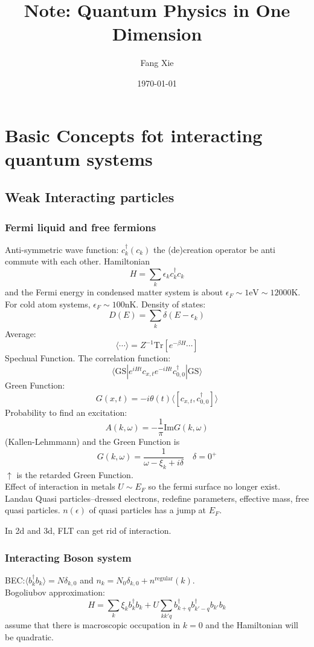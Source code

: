\documentclass{article}
\title{\bf Note: Quantum Physics in One Dimension}
\author{Fang Xie}
\date{\today}
\begin{document}
\maketitle
\section{Basic Concepts fot interacting quantum systems}
\subsection{Weak Interacting particles}
\subsubsection{Fermi liquid and free fermions}
Anti-symmetric wave function: $c^\dagger_k(c_k)$ the (de)creation operator be anti commute with each other. Hamiltonian
$$
H = \sum_k \epsilon_k c^\dagger_kc_k
$$
and the Fermi energy in condensed matter system is about $\epsilon_F \sim 1\mathrm{eV}\sim 12000\mathrm{K}$. For cold atom systems, $\epsilon_F \sim 100\mathrm{nK}$. 
Density of states:
$$
D(E) = \sum_k \delta(E-\epsilon_k)
$$
Average:
$$
\langle \cdots \rangle = Z^{-1}\mathrm{Tr}\left[e^{-\beta H}\cdots\right]
$$
Spechual Function. The correlation function:
$$
\langle \mathrm{GS} | e^{iHt}c_{x,t}e^{-iHt}c^\dagger_{0,0}|\mathrm{GS}\rangle
$$
Green Function:
$$
G(x,t)=-i\theta(t)\langle [c_{x,t},c^\dagger_{0,0}]\rangle
$$
Probability to find an excitation:
$$
A(k,\omega) = -\frac{1}{\pi}\mathrm{Im}{G(k,\omega)}
$$
(Kallen-Lehmmann)
and the Green Function is
$$
G(k,\omega) = \frac{1}{\omega-\xi_k+i\delta}\quad \delta = 0^+
$$
$\uparrow$ is the retarded Green Function.\\
Effect of interaction in metals $U\sim E_F$ so the fermi surface no longer exist.
Landau Quasi particles--dressed electrons, redefine parameters, effective mass, free quasi particles. $n(\epsilon)$ of quasi particles has a jump at $E_F$.

In 2d and 3d, FLT can get rid of interaction.

\subsubsection{Interacting Boson system}
BEC:$\langle b^\dagger_k b_k\rangle = N \delta_{k,0}$ and $n_{k} = N_0\delta_{k,0}+ n^{\mathrm{regular}}(k)$.\\Bogoliubov approximation:
$$
H = \sum_k \xi_k b^\dagger_k b_k + U\sum_{kk'q}b^\dagger_{k+q}b^\dagger_{k'-q}b_{k'}b_{k}
$$
assume that there is macroscopic occupation in $k = 0$ and the Hamiltonian will be quadratic.
\end{document}

